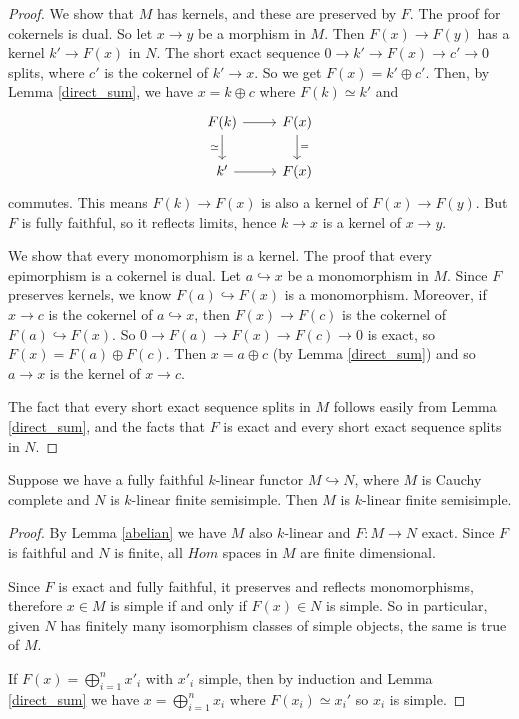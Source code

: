 \begin{proof}  We show that $M$ has kernels, and these are preserved by $F$. The proof for cokernels is dual. So let $x\to y$ be a morphism in $M$. Then $F(x)\to F(y)$ has a kernel $k'\to F(x)$ in $N$. The short exact sequence $0\to k'\to F(x)\to c'\to 0$ splits, where $c'$ is the cokernel of $k'\to x$. So we get $F(x)=k'\oplus c'$. Then, by Lemma \ref{direct_sum}, we have $x=k\oplus c$ where $F(k)\simeq k'$ and \[\begin{tikzcd}
	{F(k)} & {F(x)} \\
	{k'} & {F(x)}
	\arrow[from=1-1, to=1-2]
	\arrow["\simeq"', from=1-1, to=2-1]
	\arrow["{=}", from=1-2, to=2-2]
	\arrow[from=2-1, to=2-2]
\end{tikzcd}\] commutes. This means $F(k)\to F(x)$ is also a kernel of $F(x)\to F(y)$. But $F$ is fully faithful, so it reflects limits, hence $k\to x$ is a kernel of $x\to y$.

We show that every monomorphism is a kernel. The proof that every epimorphism is a cokernel is dual. Let $a\hookrightarrow x$ be a monomorphism in $M$. Since $F$ preserves kernels, we know $F(a)\hookrightarrow F(x)$ is a monomorphism. Moreover, if $x\to c$ is the cokernel of $a\hookrightarrow x$, then $F(x)\to F(c)$ is the cokernel of $F(a)\hookrightarrow F(x)$. So $0\to F(a)\to F(x)\to F(c)\to 0$ is exact, so $F(x)=F(a)\oplus F(c)$. Then $x=a\oplus c$ (by Lemma \ref{direct_sum}) and so $a\to x$ is the kernel of $x\to c$.

The fact that every short exact sequence splits in $M$ follows easily from Lemma \ref{direct_sum}, and the facts that $F$ is exact and every short exact sequence splits in $N$.\end{proof}



 \begin{proposition}\label{cau_semi}
Suppose we have a fully faithful $k$-linear functor $M\hookrightarrow N$, where $M$ is Cauchy complete and $N$ is $k$-linear finite semisimple. Then $M$ is $k$-linear finite semisimple.
 \end{proposition}
\begin{proof}By Lemma \ref{abelian} we have $M$ also $k$-linear and $F:M\to N$ exact. Since $F$ is faithful and $N$ is finite, all $Hom$ spaces in $M$ are finite dimensional.

Since $F$ is exact and fully faithful, it preserves and reflects monomorphisms, therefore $x\in M$ is simple if and only if $F(x)\in N$ is simple. So in particular, given $N$ has finitely many isomorphism classes of simple objects, the same is true of $M$.

If $F(x)=\bigoplus_{i=1}^n x'_i$ with $x'_i$ simple, then by induction and Lemma \ref{direct_sum} we have  $x=\bigoplus_{i=1}^n x_i$ where $F(x_i)\simeq x_i'$ so $x_i$ is simple. \end{proof}

